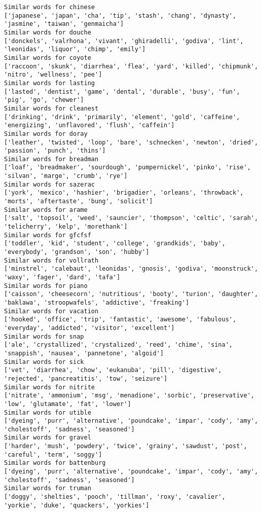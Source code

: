 \documentclass[11pt]{article}
\begin{document}
\begin{Verbatim}[commandchars=\\\{\}]
Similar words for chinese
['japanese', 'japan', 'cha', 'tip', 'stash', 'chang', 'dynasty', 'jasmine', 'taiwan', 'genmaicha']
Similar words for douche
['donckels', 'valrhona', 'vivant', 'ghiradelli', 'godiva', 'lint', 'leonidas', 'liquor', 'chimp', 'emily']
Similar words for coyote
['raccoon', 'skunk', 'diarrhea', 'flea', 'yard', 'killed', 'chipmunk', 'nitro', 'wellness', 'pee']
Similar words for lasting
['lasted', 'dentist', 'game', 'dental', 'durable', 'busy', 'fun', 'pig', 'go', 'chewer']
Similar words for cleanest
['drinking', 'drink', 'primarily', 'element', 'gold', 'caffeine', 'energizing', 'unflavored', 'flush', 'caffein']
Similar words for doray
['leather', 'twisted', 'loop', 'bare', 'schnecken', 'newton', 'dried', 'passion', 'punch', 'thins']
Similar words for breadman
['loaf', 'breadmaker', 'sourdough', 'pumpernickel', 'pinko', 'rise', 'silvan', 'marge', 'crumb', 'rye']
Similar words for sazerac
['york', 'mexico', 'hashier', 'brigadier', 'orleans', 'throwback', 'morts', 'aftertaste', 'bung', 'solicit']
Similar words for arame
['salt', 'topsoil', 'weed', 'sauncier', 'thompson', 'celtic', 'sarah', 'telicherry', 'kelp', 'morethank']
Similar words for gfcfsf
['toddler', 'kid', 'student', 'college', 'grandkids', 'baby', 'everybody', 'grandson', 'son', 'hubby']
Similar words for vollrath
['minstrel', 'calebaut', 'leonidas', 'gnosis', 'godiva', 'moonstruck', 'waxy', 'fager', 'dard', 'tafa']
Similar words for piano
['caisson', 'cheesecorn', 'nutritious', 'booty', 'turion', 'daughter', 'baklawa', 'stroopwafels', 'addictive', 'freaking']
Similar words for vacation
['hooked', 'office', 'trip', 'fantastic', 'awesome', 'fabulous', 'everyday', 'addicted', 'visitor', 'excellent']
Similar words for snap
['ale', 'crystallized', 'crystalized', 'reed', 'chime', 'sina', 'snappish', 'nausea', 'pannetone', 'algoid']
Similar words for sick
['vet', 'diarrhea', 'chow', 'eukanuba', 'pill', 'digestive', 'rejected', 'pancreatitis', 'tow', 'seizure']
Similar words for nitrite
['nitrate', 'ammonium', 'msg', 'menadione', 'sorbic', 'preservative', 'low', 'glutamate', 'fat', 'lower']
Similar words for utible
['dyeing', 'purr', 'alternative', 'poundcake', 'impar', 'cody', 'amy', 'cholestoff', 'sadness', 'seasoned']
Similar words for gravel
['harder', 'mush', 'powdery', 'twice', 'grainy', 'sawdust', 'post', 'careful', 'term', 'soggy']
Similar words for battenburg
['dyeing', 'purr', 'alternative', 'poundcake', 'impar', 'cody', 'amy', 'cholestoff', 'sadness', 'seasoned']
Similar words for truman
['doggy', 'shelties', 'pooch', 'tillman', 'roxy', 'cavalier', 'yorkie', 'duke', 'quackers', 'yorkies']

\end{Verbatim}
\end{document}
